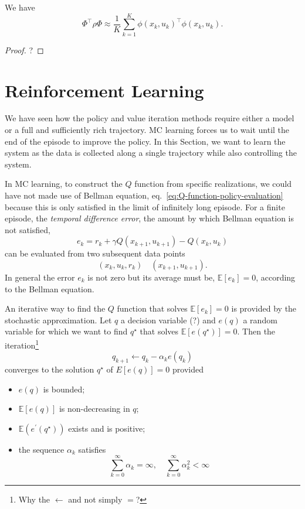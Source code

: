 \begin{theorem}
  We have
  \begin{equation*}
    \Phi^\top\rho\Phi \approx \frac{1}{K} \sum_{k=1}^K \phi(x_k,u_k)^\top\phi(x_k,u_k).
  \end{equation*}
\end{theorem}
\begin{proof}
  ?
\end{proof}

\section{Reinforcement Learning}
\label{sec:r-learning}

We have seen how the policy and value iteration methods require either a model or a full and sufficiently rich trajectory. MC learning forces us to wait until the end of the episode to improve the policy. In this Section, we want to learn the system as the data is collected along a single trajectory while also controlling the system.

In MC learning, to construct the $Q$ function from specific realizations, we could have not made use of Bellman equation, eq.~\eqref{eq:Q-function-policy-evaluation} because this is only satisfied in the limit of infinitely long episode. For a finite episode, the \emph{temporal difference error}, the amount by which Bellman equation is not satisfied,
\begin{equation}
  \label{eq:TD-error}
  e_k = r_k + \gamma Q(x_{k+1},u_{k+1}) - Q(x_k,u_k)
\end{equation}
can be evaluated from two subsequent data points
\begin{equation*}
  (x_k,u_k,r_k)\quad (x_{k+1},u_{k+1}).
\end{equation*}
In general the error $e_k$ is not zero but its average must be, $\mathbb{E}[e_k] = 0$, according to the Bellman equation.

An iterative way to find the $Q$ function that solves $\mathbb{E}[e_k] = 0$ is provided by the stochastic approximation. Let $q$ a decision variable (?) and $e(q)$ a random variable for which we want to find $q^\star$ that solves $\mathbb{E}[e(q^\star)]=0$. Then the iteration\footnote{Why the $\leftarrow$ and not simply $=$?}
\begin{equation}
  \label{eq:TD-error-iterative-solution}
  q_{k+1} \leftarrow q_k -\alpha_k e(q_k)
\end{equation}
converges to the solution $q^\star$ of $E[e(q)]=0$ provided
\begin{itemize}
\item $e(q)$ is bounded;
\item $\mathbb{E}[e(q)]$ is non-decreasing in $q$;
\item $\mathbb{E}(e^\prime(q^\star))$ exists and is positive;
\item the sequence $\alpha_k$ satisfies
  \begin{equation*}
    \sum_{k=0}^\infty \alpha_k = \infty, \quad \sum_{k=0}^\infty \alpha_k^2 < \infty
  \end{equation*}
\end{itemize}

